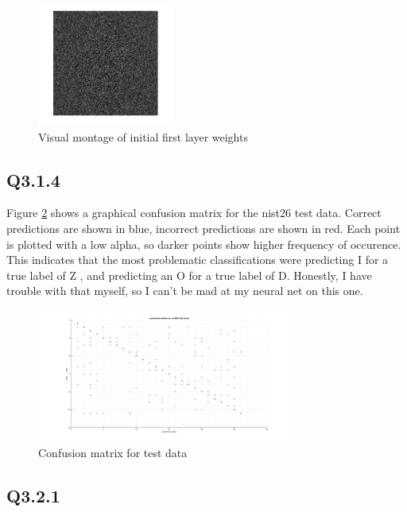 \documentclass[12pt]{article}
\begin{document}
\begin{figure}[H]
\centering
\includegraphics[page=1,width=0.4\textwidth]{init_weight_montage}
\caption{Visual montage of initial first layer weights } 
\label{fig:initweightviz}
\end{figure}   

\subsection{Q3.1.4}
Figure \ref{fig:initweightviz} shows a graphical confusion matrix for the nist26 test data. Correct predictions are shown in blue, incorrect predictions are shown in red. Each point is plotted with a low alpha, so darker points show higher frequency of occurence. This indicates that the most problematic classifications were predicting I for a true label of Z , and predicting an O for a true label of D. Honestly, I have trouble with that myself, so I can't be mad at my neural net on this one.

\begin{figure}[H]
\centering
\includegraphics[page=1,width=0.75\textwidth]{q314confusion}
\caption{ Confusion matrix for test data } 
\label{fig:initweightviz}
\end{figure}   

\subsection{Q3.2.1}
\end{document}
